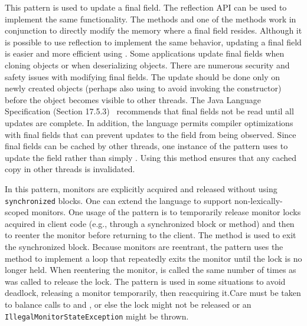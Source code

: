 \newcommand\foundinfinalfield{11}
\newcommand\usedbyfinalfield{7281}
\newcommand\mostusedfinalfield{\finalfieldmost}
\newcommand\membersfinalfield{\member{object\-Field\-Offset}; and, at least one method of the \smugroup{Heap Put} or \smugroup{Put Volatile} groups.}
\newcommand\namefinalfield{Update Final Fields}

%
{This pattern is used to update a final field.  }
{The reflection API can be used to implement the same functionality.}
{The  methods and one of the  methods work in conjunction to directly modify the memory where a final field resides.}
{Although it is possible to use reflection to implement the same behavior,
  updating a final field is easier and more efficient using \smu{}.
  Some applications update final fields when cloning objects
  or when deserializing objects.
}{
  There are numerous security and safety issues with modifying final
  fields. The update should be done only on newly created objects
  (perhaps also using  to avoid
  invoking the constructor) before the object becomes visible to
  other threads. The Java Language
  Specification (Section 17.5.3)~\cite{Gosling:2013:JLS:2462622}
  recommends that final fields not be read until all updates are
  complete. In addition, the language permits compiler optimizations
  with final fields that can prevent updates to the field from being
  observed.
  Since final fields can be cached by other threads, one instance of
  the pattern uses  to update the field rather than
  simply .
  Using this method ensures that any cached copy in other threads
  is invalidated.}

\newcommand\foundinmonitor{14}
\newcommand\usedbymonitor{7015}
\newcommand\mostusedmonitor{\monitormost}
\newcommand\membersmonitor{\member{monitor\-Enter}, \member{monitor\-Exit}}
\newcommand\namemonitor{Non-Lexically-Scoped Monitors}

%
{In this pattern, monitors are explicitly acquired and released without using
\texttt{synchronized} blocks.}
{One can extend the language to support non-lexically-scoped
monitors.}
{One usage of the pattern is to temporarily release monitor locks acquired
  in client code (e.g., through a synchronized block or method) and
  then to reenter the monitor before returning
  to the client. The  method is used to exit the
  synchronized block. Because monitors are reentrant, the pattern
  uses the method  to implement a loop
  that repeatedly exits the monitor
  until the lock is no longer held. When reentering the monitor,
   is called the same number of times
  as  was called to release the lock.
}{The pattern is used in some situations to avoid deadlock, releasing a monitor
temporarily, then reacquiring it.}{Care must be taken to balance calls to
 and , or else the lock might
not be released or an \texttt{Illegal\-Monitor\-State\-Exception} might be
thrown.}

